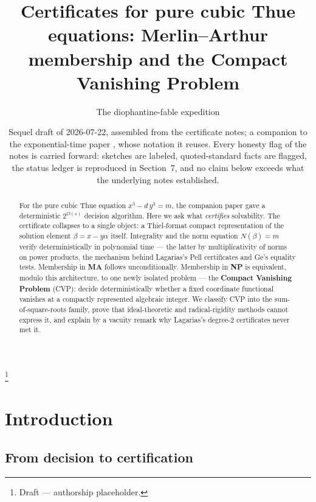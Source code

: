 \documentclass[11pt]{amsart}
\theoremstyle{plain}
\theoremstyle{remark}
\begin{document}
\title[Certificates for pure cubic Thue equations]{Certificates for
  pure cubic Thue equations: Merlin--Arthur membership and the Compact
  Vanishing Problem}

\author{The diophantine-fable expedition}
\thanks{Draft --- authorship placeholder.}

\date{Sequel draft of 2026-07-22, assembled from the certificate
  notes; a companion to the exponential-time paper \cite{companion},
  whose notation it reuses. Every honesty flag of the notes is carried
  forward: sketches are labeled, quoted-standard facts are flagged,
  the status ledger is reproduced in Section~7, and no claim below
  exceeds what the underlying notes established.}

\begin{abstract}
For the pure cubic Thue equation $x^3 - d\,y^3 = m$, the companion
paper gave a deterministic $2^{O(s)}$ decision algorithm. Here we ask
what \emph{certifies} solvability. The certificate collapses to a
single object: a Thiel-format compact representation of the solution
element $\beta = x - y\alpha$ itself. Integrality and the norm
equation $N(\beta) = m$ verify deterministically in polynomial time
--- the latter by multiplicativity of norms on power products, the
mechanism behind Lagarias's Pell certificates and Ge's equality tests.
Membership in \textbf{MA} follows unconditionally. Membership in
\textbf{NP} is equivalent, modulo this architecture, to one newly
isolated problem --- the \textbf{Compact Vanishing Problem} (CVP):
decide deterministically whether a fixed coordinate functional
vanishes at a compactly represented algebraic integer. We classify
CVP into the sum-of-square-roots family, prove that ideal-theoretic
and radical-rigidity methods cannot express it, and explain by a
vacuity remark why Lagarias's degree-2 certificates never met it.
\end{abstract}

\maketitle

\section{Introduction}\label{sec:intro}

\subsection{From decision to certification}\label{sec:fromdecision}
\end{document}
